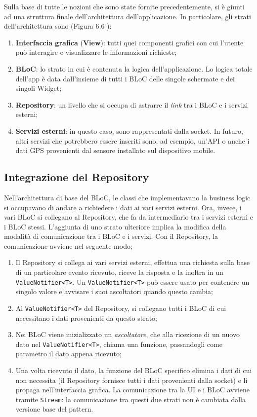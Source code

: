 Sulla base di tutte le nozioni che sono state fornite precedentemente, si è giunti ad una struttura finale dell'architettura dell'applicazione. In particolare, gli strati dell'architettura sono (Figura 6.6 \cite{architettura_implementata}):
\begin{enumerate}
	\item \textbf{Interfaccia grafica} (\textbf{View}): tutti quei componenti grafici con cui l'utente può interagire e visualizzare le informazioni richieste;
	\item \textbf{BLoC}: lo strato in cui è contenuta la logica dell'applicazione. Lo logica totale dell'app è data dall'insieme di tutti i BLoC delle singole schermate e dei singoli Widget;
	\item \textbf{Repository}: un livello che si occupa di astrarre il \textit{link} tra i BLoC e i servizi esterni;
	\item \textbf{Servizi esterni}: in questo caso, sono rappresentati dalla socket. In futuro, altri servizi che potrebbero essere inseriti sono, ad esempio, un'API o anche i dati GPS provenienti dal sensore installato sul dispositivo mobile.
\end{enumerate}

\subsection{Integrazione del Repository}
Nell'architettura di base del BLoC, le classi che implementavano la business logic si occupavano di andare a richiedere i dati ai vari servizi esterni. Ora, invece, i vari BLoC si collegano al Repository, che fa da intermediario tra i servizi esterni e i BLoC stessi. L'aggiunta di uno strato ulteriore implica la modifica della modalità di comunicazione tra i BLoC e i servizi. Con il Repository, la comunicazione avviene nel seguente modo;
\begin{enumerate}
	\item Il Repository si collega ai vari servizi esterni, effettua una richiesta sulla base di un particolare evento ricevuto, riceve la risposta e la inoltra in un \verb|ValueNotifier<T>|. Un \verb|ValueNotifier<T>| può essere usato per contenere un singolo valore e avvisare i suoi ascoltatori quando questo cambia;
	\item Al \verb|ValueNotifier<T>| del Repository, si collegano tutti i BLoC di cui necessitano i dati provenienti da questo strato;
	\item Nei BLoC viene inizializzato un \textit{ascoltatore}, che alla ricezione di un nuovo dato nel \verb|ValueNotifier<T>|, chiama una funzione, passandogli come parametro il dato appena ricevuto;
	\item Una volta ricevuto il dato, la funzione del BLoC specifico elimina i dati di cui non necessita (il Repository fornisce tutti i dati provenienti dalla socket) e li propaga nell'interfaccia grafica. La comunicazione tra la UI e i BLoC avviene tramite \verb|Stream|: la comunicazione tra questi due strati non è cambiata dalla versione base del pattern.
\end{enumerate}

